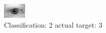 \begin{figure}[h!]
\begin{center}
\includegraphics[width=0.60\columnwidth]{figures/ID583_class_2_target_3.png}
\end{center}
\caption{ Classification: 2 actual target: 3}
\label{fig:ID583_class_2_target_3}
\end{figure}
